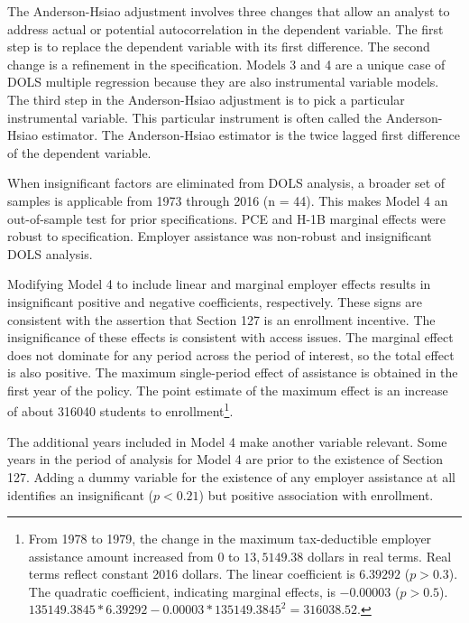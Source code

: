 \documentclass[review]{elsarticle}
\begin{document}
The Anderson-Hsiao adjustment involves three changes that allow an analyst to address actual or potential autocorrelation in the dependent variable.
The first step is to replace the dependent variable with its first difference.
The second change is a refinement in the specification.
Models 3 and 4 are a unique case of DOLS multiple regression because they are also instrumental variable models.
The third step in the Anderson-Hsiao adjustment is to pick a particular instrumental variable.
This particular instrument is often called the Anderson-Hsiao estimator.
The Anderson-Hsiao estimator is the twice lagged first difference of the dependent variable.

When insignificant factors are eliminated from DOLS analysis,
a broader set of samples is applicable from 1973 through 2016 (n = 44).
This makes Model 4 an out-of-sample test for prior specifications.
PCE and H-1B marginal effects were robust to specification.
Employer assistance was non-robust and insignificant DOLS analysis.

Modifying Model 4 to include linear and marginal employer effects
results in insignificant positive and negative coefficients, respectively.
These signs are consistent with the assertion that Section 127 is an enrollment incentive.
The insignificance of these effects is consistent with access issues.
The marginal effect does not dominate for any period across the period of interest,
so the total effect is also positive.
The maximum single-period effect of assistance is obtained in the first year of the policy.
The point estimate of the maximum effect is an increase of about 316040 students to enrollment\footnote{
    From 1978 to 1979, the change in the maximum tax-deductible employer assistance amount increased from
    0 to $13,5149.38$ dollars in real terms.
    Real terms reflect constant 2016 dollars.
    The linear coefficient is $6.39292$ ($p > 0.3$).
    The quadratic coefficient, indicating marginal effects, is $-0.00003$ ($p > 0.5$).
    $135149.3845*6.39292 - 0.00003*135149.3845^2 = 316038.52$.
}.

The additional years included in Model 4 make another variable relevant.
Some years in the period of analysis for Model 4 are prior to the existence of Section 127.
Adding a dummy variable for the existence of any employer assistance at all
identifies an insignificant ($p < 0.21$) but positive association with enrollment.
\end{document}
